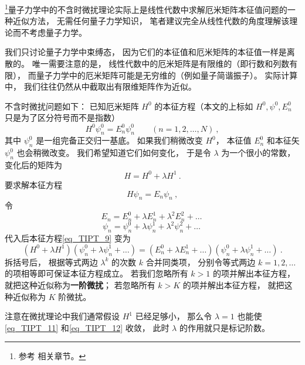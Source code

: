 

\footnote{参考 \cite{GriffQ} \cite{Shankar} \cite{Sakurai} \cite{Merzbacher} 相关章节。}量子力学中的不含时微扰理论实际上是线性代数中求解厄米矩阵本征值问题的一种近似方法， 无需任何量子力学知识， 笔者建议完全从线性代数的角度理解该理论而不考虑量子力学。

我们只讨论量子力学中束缚态， 因为它们的本征值和厄米矩阵的本征值一样是离散的。 唯一需要注意的是， 线性代数中的厄米矩阵是有限维的（即行数和列数有限）， 而量子力学中的厄米矩阵可能是无穷维的（例如量子简谐振子）。 实际计算中， 我们往往仍然从中截取出有限维矩阵作为近似。

不含时微扰问题如下： 已知厄米矩阵 $H^0$ 的本征方程（本文的上标如 $H^0, \psi^0, E_n^0$ 只是为了区分符号而不是指数）
\begin{equation}
H^0 \psi_n^0 = E_n^0 \psi_n^0 \qquad (n = 1,2,\dots, N)~,
\end{equation}
其中 $\psi_n^0$ 是一组完备正交归一基底。 如果我们稍微改变 $H^0$， 本征值 $E_n^0$ 和本征矢 $\psi_n^0$ 也会稍微改变。 我们希望知道它们如何变化， 于是令 $\lambda$ 为一个很小的常数， 变化后的矩阵为
\begin{equation}\label{eq_TIPT_3}
H = H^0 + \lambda H^1~.
\end{equation}
要求解本征方程
\begin{equation}\label{eq_TIPT_9}
H \psi_n = E_n \psi_n~,
\end{equation}
令
\begin{equation}\label{eq_TIPT_11}
E_n = E_n^0 + \lambda E_n^1 + \lambda^2 E_n^2 + \dots~
\end{equation}
\begin{equation}\label{eq_TIPT_12}
\psi_n = \psi_n^0 + \lambda\psi_n^1 + \lambda^2 \psi_n^2 + \dots~
\end{equation}
代入后本征方程\autoref{eq_TIPT_9} 变为
\begin{equation}\label{eq_TIPT_10}
(H^0 + \lambda H^1)(\psi_n^0 + \lambda\psi_n^1 + \dots) = (E_n^0 + \lambda E_n^1 + \dots)(\psi_n^0 + \lambda\psi_n^1 + \dots)~.
\end{equation}
拆括号后， 根据等式两边 $\lambda^k$ 的次数 $k$ 合并同类项， 分别令等式两边 $k=1,2,\dots$ 的项相等即可保证本征方程成立。 若我们忽略所有 $k > 1$ 的项并解出本征方程， 就把这种近似称为\textbf{一阶微扰}； 若忽略所有 $k > K$ 的项并解出本征方程， 就把这种近似称为 $K$ 阶微扰。

注意在微扰理论中我们通常假设 $H^1$ 已经足够小， 那么令 $\lambda = 1$ 也能使\autoref{eq_TIPT_11} 和\autoref{eq_TIPT_12} 收敛， 此时 $\lambda$ 的作用就只是标记阶数。

